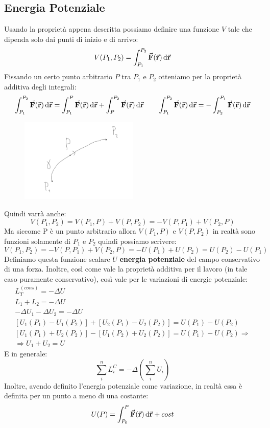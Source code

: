 \documentclass{report}
\newcommand{\then}{\ensuremath{\Rightarrow}}
\renewcommand{\r}{\va{r}}
\newcommand{\F}{\va{F}}
\begin{document}
\subsection{Energia Potenziale}
Usando la proprietà appena descritta possiamo definire una funzione $V$ tale che dipenda solo dai punti di inizio e di arrivo:
\[V(P_1,P_2)=\int_{P_1}^{P_2}\F(\r)\dif\r\]
Fissando un certo punto arbitrario $P$ tra $P_1$ e $P_2$ otteniamo per la proprietà additiva degli integrali:
\[\int_{P_1}^{P_2}\F(\r)\dif\r=\int_{P_1}^{P}\F(\r)\dif\r+\int_{P}^{P_2}\F(\r)\dif\r\quad\quad\int_{P_1}^{P_2}\F(\r)\dif\r=-\int_{P_2}^{P_1}\F(\r)\dif\r\]
\begin{figure}[H]
    \centering
    \includegraphics[width=0.5\textwidth]{Potenziale.png}
\end{figure}
Quindi varrà anche:
\[V(P_1,P_2)=V(P_1,P)+V(P,P_2)=-V(P,P_1)+V(P_2,P)\]
Ma siccome P è un punto arbitrario allora $V(P_1,P)$ e $V(P,P_2)$ in realtà sono funzioni solamente di $P_1$ e $P_2$ quindi possiamo scrivere:
\[V(P_1,P_2)=-V(P,P_1)+V(P_2,P)=-U(P_1)+U(P_2)=\boxed{U(P_2)-U(P_1)}\]
Definiamo questa funzione scalare $U$ \textbf{energia potenziale} del campo conservativo di una forza. Inoltre, così come vale la proprietà additiva per il lavoro (in tale caso puramente conservativo), così vale per le variazioni di energie potenziale:
\begin{align*}
    L_T^{(cons)}=-\Delta U\\
    L_1+L_2=-\Delta U\\
    -\Delta U_1-\Delta U_2=-\Delta U\\
    [U_1(P_1)-U_1(P_2)]+[U_2(P_1)-U_2(P_2)]=U(P_1)-U(P_2)\\
    [U_1(P_1)+U_2(P_2)]-[U_1(P_2)+U_2(P_2)]=U(P_1)-U(P_2)\then\\
    \then \boxed{U_1+U_2=U}
\end{align*}
E in generale:
\[\sum_i^nL_i^C=-\Delta\left(\sum_i^nU_i\right)\]
Inoltre, avendo definito l'energia potenziale come variazione, in realtà essa è definita per un punto a meno di una costante:
\[U(P)=\int_{P_0}^P\F(\r)\dif\r+cost\]
\end{document}
